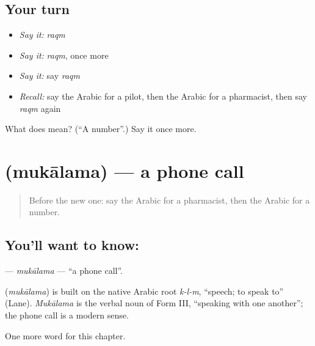 \subsection*{Your turn}
\begin{itemize}
\raggedright
  \item \emph{Say it:} \emph{raqm}
  \item \emph{Say it:} \emph{raqm}, once more
  \item \emph{Say it:} say \emph{raqm}
  \item \emph{Recall:} say the Arabic for a pilot, then the Arabic for a pharmacist, then say \emph{raqm} again
\end{itemize}

\begin{tcolorbox}[breakable,colback=teal!4,colframe=teal!35!black,title={Before you move on}]
What does  mean? (\textquotedblleft{}A number\textquotedblright{}.) Say it once more.
\end{tcolorbox}
\section[\texorpdfstring{\ar{مكالمة} (mukālama)}{مكالمة (mukālama)}]{ (mukālama) — a phone call}

\label{lesson:AR-C281-mukalama}



\begin{quote}
Before the new one: say the Arabic for a pharmacist, then the Arabic for a number.
\end{quote}

\subsection*{You'll want to know: }
\textbf{} — \emph{mukālama} — \textquotedblleft{}a phone call\textquotedblright{}.

\begin{cousinweb}
\textbf{} (\emph{mukālama}) is built on the native Arabic root \emph{k-l-m}, \textquotedblleft{}speech; to speak to\textquotedblright{} (Lane). \emph{Mukālama} is the verbal noun of Form III, \textquotedblleft{}speaking with one another\textquotedblright{}; the phone call is a modern sense.
\end{cousinweb}

\begin{grammarlens}[title={What you've built}]
One more word for this chapter.
\end{grammarlens}

